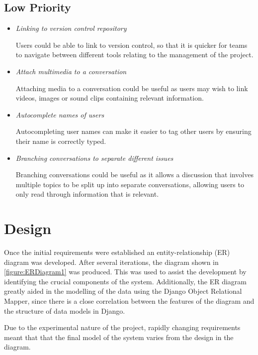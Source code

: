 \documentclass[a4paper]{l3proj}
\begin{document}
\subsection{Low Priority}
\begin{itemize}
\item \textit{Linking to version control repository} \par
Users could be able to link to version control, so that it is quicker for teams to navigate between different tools relating to the management of the project.

\item \textit{Attach multimedia to a conversation} \par
Attaching media to a conversation could be useful as users may wish to link videos, images or sound clips containing relevant information.

\item \textit{Autocomplete names of users} \par
Autocompleting user names can make it easier to tag other users by ensuring their name is correctly typed.

\item \textit{Branching conversations to separate different issues} \par
Branching conversations could be useful as it allows a discussion that involves multiple topics to be split up into separate conversations, allowing users to only read through information that is relevant.

\end{itemize}

\fi


\section{Design}
\label{design}

Once the initial requirements were established an entity-relationship (ER) diagram was developed. After several iterations, the diagram shown in \autoref{figure:ERDiagram1} was produced. This was used to assist the development by identifying the crucial components of the system. Additionally, the ER diagram greatly aided in the modelling of the data using the Django Object Relational Mapper, since there is a close correlation between the features of the diagram and the structure of data models in Django.

Due to the experimental nature of the project, rapidly changing requirements meant that that the final model of the system varies from the design in the diagram.
\end{document}

